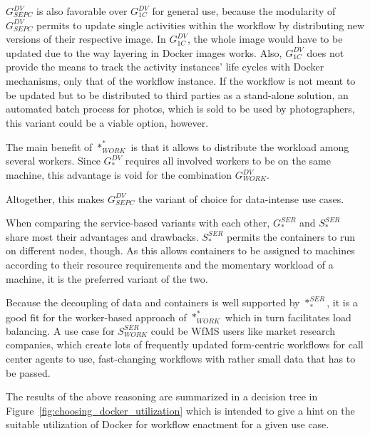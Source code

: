   $G_{SEPC}^{DV}$ is also favorable over $G_{1C}^{DV}$ for general use, because the modularity of $G_{SEPC}^{DV}$ permits to update single activities within the workflow by distributing new versions of their respective image. In $G_{1C}^{DV}$, the whole image would have to be updated due to the way layering in Docker images works. Also, $G_{1C}^{DV}$ does not provide the means to track the activity instances' life cycles with Docker mechanisms, only that of the workflow instance. If the workflow is not meant to be updated but to be distributed to third parties as a stand-alone solution, \eg an automated batch process for photos, which is sold to be used by photographers, this variant could be a viable option, however.

  The main benefit of $*_{WORK}^{*}$ is that it allows to distribute the workload among several workers. Since $G_{*}^{DV}$ requires all involved workers to be on the same machine, this advantage is void for the combination $G_{WORK}^{DV}$.

  Altogether, this makes $G_{SEPC}^{DV}$ the variant of choice for data-intense use cases.

  When comparing the service-based variants with each other, $G_{*}^{SER}$ and $S_{*}^{SER}$ share most their advantages and drawbacks. $S_{*}^{SER}$ permits the containers to run on different nodes, though. As this allows containers to be assigned to machines according to their resource requirements and the momentary workload of a machine, it is the preferred variant of the two.

  Because the decoupling of data and containers is well supported by $*_{*}^{SER}$, it is a good fit for the worker-based approach of $*_{WORK}^{*}$ which in turn facilitates load balancing. A use case for $S_{WORK}^{SER}$ could be \ac{WfMS} users like market research companies, which create lots of frequently updated form-centric workflows for call center agents to use, \ie fast-changing workflows with rather small data that has to be passed.

  The results of the above reasoning are summarized in a decision tree in Figure~\ref{fig:choosing_docker_utilization} which is intended to give a hint on the suitable utilization of Docker for workflow enactment for a given use case.

